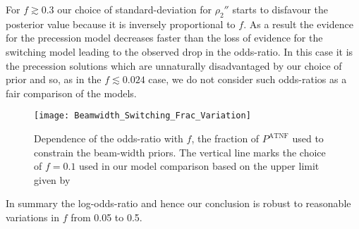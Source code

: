 \documentclass[../full_thesis/full_thesis.tex]{subfiles}
\newcommand{\PATNF}{P^{\mathrm{ATNF}}}
\begin{document}
For $f \gtrsim 0.3$ our choice of standard-deviation for $\rho_2''$ starts to
disfavour the posterior value because it is inversely proportional to $f$. As
a result the evidence for the precession model decreases faster than the loss of
evidence for the switching model leading to the observed drop in the odds-ratio.
In this case it is the precession solutions which are unnaturally disadvantaged
by our choice of prior and so, as in the $f\lesssim 0.024$ case, we do not consider
such odds-ratios as a fair comparison of the models.

\begin{figure}
\centering
\texttt{[image: Beamwidth\_Switching\_Frac\_Variation]}
\caption{Dependence of the
         odds-ratio with $f$, the fraction of $\PATNF$ used to constrain the
         beam-width priors. The vertical line
         marks the choice of $f=0.1$ used in our model comparison based on the
         upper limit given by \citet{Lyne1988}}
\label{fig: beamwidth switching frac variation}
\end{figure}

In summary the log-odds-ratio and hence our conclusion is robust to reasonable
variations in $f$ from 0.05 to 0.5.
\end{document}
